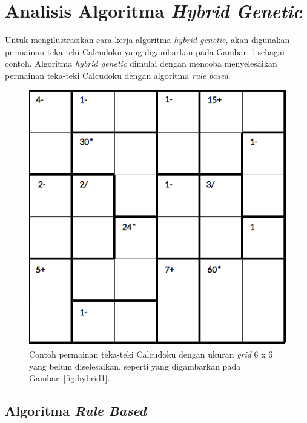 \section{Analisis Algoritma \textit{Hybrid Genetic}}
\label{sec:analisishg}

Untuk mengilustrasikan cara kerja algoritma \textit{hybrid genetic}, akan digunakan permainan teka-teki Calcudoku yang digambarkan pada Gambar~\ref{fig:analisishg1} sebagai contoh. Algoritma \textit{hybrid genetic} dimulai dengan mencoba menyelesaikan permainan teka-teki Calcudoku dengan algoritma \textit{rule based}.

\begin{figure}
\centering
\captionsetup{justification=centering}
\includegraphics[scale=0.333]{Gambar/hybridgenetic/Puzzle}
\caption[Contoh permainan teka-teki Calcudoku dengan ukuran \textit{grid} 6 x 6 yang belum diselesaikan, seperti yang digambarkan pada Gambar~\ref{fig:hybrid1}. \cite{johanna:12:hybrid}]{Contoh permainan teka-teki Calcudoku dengan ukuran \textit{grid} 6 x 6 yang belum diselesaikan, seperti yang digambarkan pada Gambar~\ref{fig:hybrid1}. \cite{johanna:12:hybrid}}
\label{fig:analisishg1}
\end{figure}

\subsection{Algoritma \textit{Rule Based}}
\label{sec:analisisrb}

